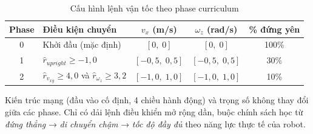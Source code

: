 \begin{table}[H]
    \centering
    \caption{Cấu hình lệnh vận tốc theo phase curriculum}
    \label{tab:curriculum_phases}
    \renewcommand{\arraystretch}{1.3}
    \begin{tabular}{|c|l|c|c|c|}
    \hline
    \textbf{Phase} & \textbf{Điều kiện chuyển} & $v_x$ (m/s) & $\omega_z$ (rad/s) & \textbf{\% đứng yên} \\
    \hline
    0 & Khởi đầu (mặc định)                        & $[0,\;0]$      & $[0,\;0]$      & 100\% \\
    1 & $\hat{r}_{upright} \geq -1{,}0$           & $[-0{,}5,\;0{,}5]$ & $[-0{,}5,\;0{,}5]$ & 30\% \\
    2 & $\hat{r}_{v_{xy}} \geq 4{,}0$ và $\hat{r}_{\omega_z} \geq 3{,}2$ & $[-1{,}0,\;1{,}0]$ & $[-1{,}0,\;1{,}0]$ & 10\% \\
    \hline
    \end{tabular}
\end{table}

Kiến trúc mạng (đầu vào cố định, 4 chiều hành động) và trọng số không
thay đổi giữa các phase. Chỉ có dải lệnh điều khiển mở rộng dần,
buộc chính sách học từ \textit{đứng thẳng} → \textit{di chuyển chậm}
→ \textit{tốc độ đầy đủ} theo năng lực thực tế của robot.
